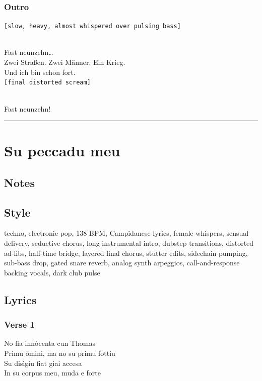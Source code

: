 \subsubsection{Outro}\label{outro-7}

\texttt{{[}slow,\ heavy,\ almost\ whispered\ over\ pulsing\ bass{]}}\strut \\
Fast neunzehn\ldots{}\\
Zwei Straßen. Zwei Männer. Ein Krieg.\\
Und ich bin schon fort.\\
\texttt{{[}final\ distorted\ scream{]}}\strut \\
Fast neunzehn!

\begin{center}\rule{0.5\linewidth}{0.5pt}\end{center}

\section{Su peccadu meu}\label{su-peccadu-meu}

\subsection{Notes}\label{notes-33}

\subsection{Style}\label{style-32}

techno, electronic pop, 138 BPM, Campidanese lyrics, female whispers,
sensual delivery, seductive chorus, long instrumental intro, dubstep
transitions, distorted ad-libs, half-time bridge, layered final chorus,
stutter edits, sidechain pumping, sub-bass drop, gated snare reverb,
analog synth arpeggios, call-and-response backing vocals, dark club
pulse

\subsection{Lyrics}\label{lyrics-32}

\subsubsection{Verse 1}\label{verse-1-24}

No fia innòcenta cun Thomas\\
Primu òmini, ma no su primu fottiu\\
Su disìgiu fiat giai accesa\\
In su corpus meu, muda e forte

